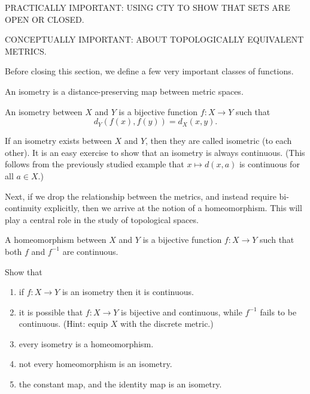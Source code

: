 PRACTICALLY IMPORTANT: USING CTY TO SHOW THAT SETS ARE OPEN OR CLOSED.

CONCEPTUALLY IMPORTANT: ABOUT TOPOLOGICALLY EQUIVALENT METRICS.

Before closing this section, we define a few very important classes of functions.

An isometry is a distance-preserving map between metric spaces.
\begin{ndfn}[Isometry]
  An isometry between $X$ and $Y$ is a bijective function $f:X \to Y$ such that
  \begin{equation*}
    d_{Y}(f(x), f(y)) = d_{X}(x, y).
  \end{equation*}
\end{ndfn}
If an isometry exists between $X$ and $Y$, then they are called isometric (to each other). It is an easy exercise to show that an isometry is always continuous. (This follows from the previously studied example that $x \mapsto d(x,a)$ is continuous for all $a \in X$.)

Next, if we drop the relationship between the metrics, and instead require bi-continuity explicitly, then we arrive at the notion of a homeomorphism. This will play a central role in the study of topological spaces.
\begin{ndfn}[Homeomorphism]
  A homeomorphism between $X$ and $Y$ is a bijective function $f:X \to Y$ such that both $f$ and $f^{-1}$ are continuous.
\end{ndfn}

\begin{exercise}
Show that
\begin{enumerate}
\item if $f: X \to Y$ is an isometry then it is continuous.
\item it is possible that $f: X \to Y$ is bijective and continuous, while $f^{-1}$ fails to be continuous. (Hint: equip $X$ with the discrete metric.)
\item every isometry is a homeomorphism.
\item not every homeomorphism is an isometry.
\item the constant map, and the identity map is an isometry.
\end{enumerate}
\end{exercise}
